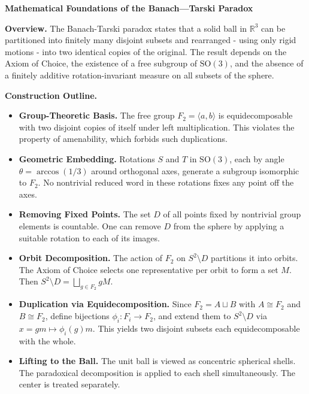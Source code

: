 \begin{technical}
    {\Large\textbf{Mathematical Foundations of the Banach—Tarski Paradox}}
    
    \textbf{Overview.}  
    The Banach-Tarski paradox states that a solid ball in \(\mathbb{R}^3\) can be partitioned into finitely many disjoint subsets and rearranged - using only rigid motions - into two identical copies of the original. The result depends on the Axiom of Choice, the existence of a free subgroup of \(\mathrm{SO}(3)\), and the absence of a finitely additive rotation-invariant measure on all subsets of the sphere.

    \textbf{Construction Outline.}
    \begin{itemize}[leftmargin=*]
        \item \textbf{Group-Theoretic Basis.}  
        The free group \(F_2 = \langle a, b \rangle\) is equidecomposable with two disjoint copies of itself under left multiplication. This violates the property of amenability, which forbids such duplications.

        \item \textbf{Geometric Embedding.}  
        Rotations \(S\) and \(T\) in \(\mathrm{SO}(3)\), each by angle \(\theta = \arccos(1/3)\) around orthogonal axes, generate a subgroup isomorphic to \(F_2\). No nontrivial reduced word in these rotations fixes any point off the axes.

        \item \textbf{Removing Fixed Points.}  
        The set \(D\) of all points fixed by nontrivial group elements is countable. One can remove \(D\) from the sphere by applying a suitable rotation to each of its images.

        \item \textbf{Orbit Decomposition.}  
        The action of \(F_2\) on \(S^2 \setminus D\) partitions it into orbits. The Axiom of Choice selects one representative per orbit to form a set \(M\). Then \(S^2 \setminus D = \bigsqcup_{g \in F_2} gM\).

        \item \textbf{Duplication via Equidecomposition.}  
        Since \(F_2 = A \sqcup B\) with \(A \cong F_2\) and \(B \cong F_2\), define bijections \(\phi_i : F_i \to F_2\), and extend them to \(S^2 \setminus D\) via \(x = gm \mapsto \phi_i(g)m\). This yields two disjoint subsets each equidecomposable with the whole.

        \item \textbf{Lifting to the Ball.}  
        The unit ball is viewed as concentric spherical shells. The paradoxical decomposition is applied to each shell simultaneously. The center is treated separately.
    \end{itemize}
    

\end{technical}
